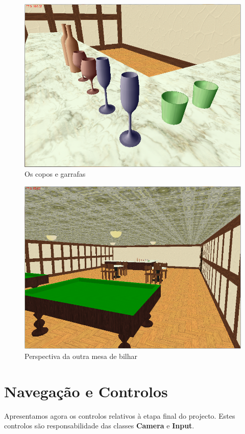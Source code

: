 \documentclass[a5paper,onecolumn, 11pt]{article}
\begin{document}
\begin{figure}[!htb]
    \centering
    \includegraphics[scale=0.5]{bar7.png}
    \caption{Os copos e garrafas}
\end{figure}
\begin{figure}[!htb]
    \centering
    \includegraphics[scale=0.5]{bar8.png}
    \caption{Perspectiva da outra mesa de bilhar}
\end{figure}

\newpage
\clearpage
\section{Navegação e Controlos}
Apresentamos agora os controlos relativos à etapa final do projecto. Estes controlos são responsabilidade das classes \textbf{Camera} e \textbf{Input}.
\end{document}
